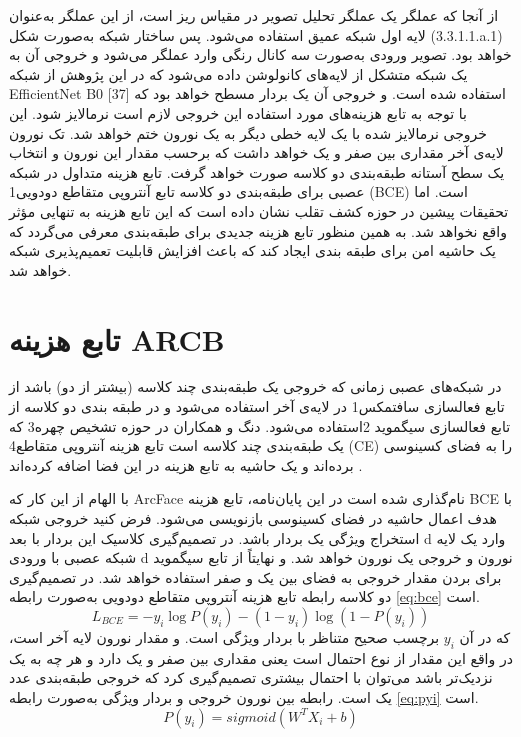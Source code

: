  از آنجا که عملگر  یک عملگر تحلیل تصویر در مقیاس ریز است، از این عملگر به‌عنوان لایه اول شبکه عمیق استفاده می‌شود. پس ساختار شبکه به‌صورت شکل (3.3.1.1.a.1) خواهد بود.
 تصویر ورودی به‌صورت سه کانال رنگی وارد عملگر   می‌شود و خروجی آن به یک شبکه متشکل از لایه‌های کانولوشن داده می‌شود که در این پژوهش از شبکه EfficientNet B0 [37] استفاده شده است. و خروجی آن یک بردار مسطح خواهد بود که با توجه به تابع هزینه‌های مورد استفاده این خروجی لازم است نرمالایز شود. این خروجی نرمالایز شده با یک لایه خطی دیگر به یک نورون ختم خواهد شد. تک نورون لایه‌ی آخر مقداری بین صفر و یک خواهد داشت که برحسب مقدار این نورون و انتخاب یک سطح آستانه طبقه‌بندی دو کلاسه صورت خواهد گرفت.
 تابع هزینه متداول در شبکه عصبی برای طبقه‌بندی دو کلاسه تابع آنتروپی متقاطع دودویی1  (BCE) است. اما تحقیقات پیشین در حوزه کشف تقلب نشان داده است که این تابع هزینه به تنهایی مؤثر واقع نخواهد شد. به همین منظور تابع هزینه جدیدی برای طبقه‌بندی معرفی می‌گردد که یک حاشیه امن برای طبقه بندی ایجاد کند که باعث افزایش قابلیت تعمیم‌پذیری شبکه خواهد شد.
\section{تابع هزینه ARCB}
در شبکه‌های عصبی زمانی که خروجی یک طبقه‌بندی چند کلاسه (بیشتر از دو) باشد از تابع فعالسازی سافتمکس1 در لایه‌ی آخر استفاده می‌شود و در طبقه بندی دو کلاسه از تابع فعالسازی سیگموید 2استفاده می‌شود. دنگ و همکاران در حوزه تشخیص چهره3 که یک طبقه‌بندی چند کلاسه است تابع هزینه آنتروپی متقاطع4  (CE) را به فضای کسینوسی برده‌اند و یک حاشیه به تابع هزینه در این فضا اضافه کرده‌اند
\cite{deng2019arcface}.

با الهام از این کار که ArcFace نام‌گذاری شده است در این پایان‌نامه، تابع هزینه BCE با هدف اعمال حاشیه در فضای کسینوسی بازنویسی می‌شود. فرض کنید خروجی شبکه استخراج ویژگی یک بردار  باشد. در تصمیم‌گیری کلاسیک این بردار با بعد d وارد یک لایه شبکه عصبی با ورودی d نورون و خروجی یک نورون خواهد شد. و نهایتاً از تابع سیگموید برای بردن مقدار خروجی به فضای بین یک و صفر استفاده خواهد شد.
در تصمیم‌گیری دو کلاسه رابطه تابع هزینه آنتروپی متقاطع دودویی به‌صورت رابطه
\ref{eq:bce}
است.
\begin{equation}\label{eq:bce}
	L_{BCE} = -y_i \log{P(y_i)} - (1-y_i)\log{( 1-P(y_i) )}
\end{equation}
 که در آن 
$y_i$
  برچسب صحیح متناظر با بردار ویژگی   است. و  مقدار نورون لایه آخر است، در واقع این مقدار از نوع احتمال است یعنی مقداری بین صفر و یک دارد و هر چه به یک نزدیک‌تر باشد می‌توان با احتمال بیشتری تصمیم‌گیری کرد که خروجی طبقه‌بندی عدد یک است.
رابطه بین نورون خروجی و بردار ویژگی   به‌صورت رابطه
\ref{eq:pyi}
است.
\begin{equation}\label{eq:pyi}
	P(y_i) = sigmoid(W^TX_i+b)
\end{equation}

